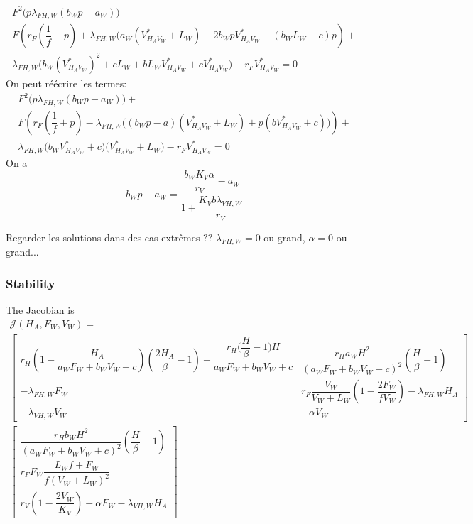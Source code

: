 \documentclass{article}
\newcommand{\lfw}{\lambda_{FH, W}}
\newcommand{\lvw}{\lambda_{VH, W}}
\begin{document}
\begin{itemize}
\begin{multline}
F^2 \Big(p \lfw (b_Wp - a_W) \Big) + \\
F \left(r_F (\dfrac{1}{f} + p) + \lfw (a_W(V^*_{H_AV_W} + L_W) - 2 b_W p V^*_{H_AV_W} - (b_W L_W + c) p \right) + \\
\lfw \Big( b_W (V^*_{H_AV_W})^2 + c L_W + bL_W V^*_{H_AV_W} + c V^*_{H_AV_W} \Big) - r_F V^*_{H_AV_W} = 0
\end{multline}
On peut réécrire les termes:
\begin{multline}
F^2 \Big(p \lfw (b_Wp - a_W) \Big) + \\
F \left(r_F (\dfrac{1}{f} + p) - \lfw \big((b_Wp-a)(V^*_{H_AV_W} + L_W) + p (bV^*_{H_AV_W} + c)\big) \right) + \\
\lfw \Big(b_W V^*_{H_AV_W} + c \Big) \Big(V^*_{H_AV_W} + L_W \Big) - r_F V^*_{H_AV_W} = 0
\end{multline}
On a 
$$
b_W p - a_W = \dfrac{\dfrac{b_W K_V \alpha}{r_V} - a_W}{1 + \dfrac{K_V b \lvw}{r_V}}
$$

Regarder les solutions dans des cas extrêmes ?? $\lfw = 0$ ou grand, $\alpha =0$ ou grand...

\end{itemize}


\subsubsection{Stability}
The Jacobian is 
{\footnotesize
\begin{multline}
\mathcal{J}(H_A,F_W,V_W) = \\
\begin{bmatrix}
r_H(1-\dfrac{H_A}{a_W F_W+b_W V_W+c})(\dfrac{2H_A}{\beta}-1) - \dfrac{r_H \Big(\dfrac{H}{\beta}-1\Big)H}{a_WF_W+b_WV_W+c} & \dfrac{r_H a_W H^2}{(a_WF_W+b_WV_W+c)^2} (\dfrac{H}{\beta}-1) \\
-\lfw F_W & r_F \dfrac{V_W}{V_W + L_W} \left(1 - \dfrac{2F_W}{fV_W}\right) -\lfw H_A  \\
-\lvw V_W & -\alpha V_W
\end{bmatrix} \\
\begin{bmatrix}
 \dfrac{r_H b_W H^2}{(a_WF_W+b_WV_W+c)^2} (\dfrac{H}{\beta}-1) \\
r_F F_W \dfrac{L_W f + F_W}{f (V_W + L_W)^2} \\
 r_V \left(1 - \dfrac{2V_W}{K_V}\right) - \alpha F_W - \lvw H_A 
\end{bmatrix}
\end{multline}}
\end{document}
